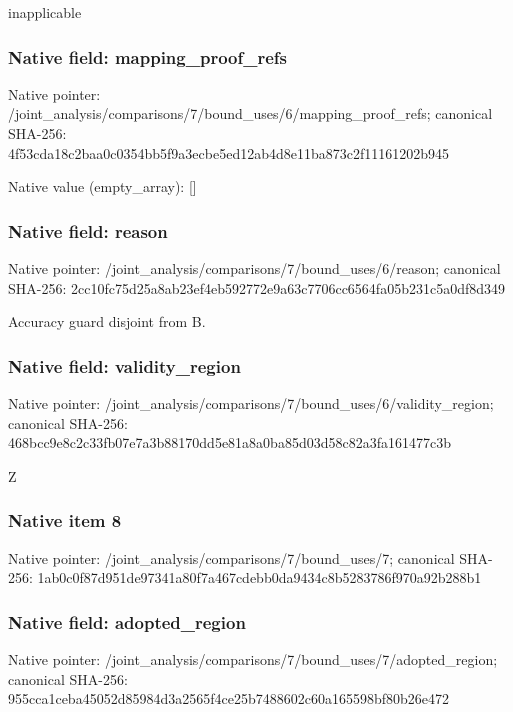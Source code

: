 \documentclass[10pt,a4paper]{article}
\begin{document}
\begingroup\raggedright\sloppy inapplicable\par\endgroup

\subsubsection{Native field: mapping\_\allowbreak{}proof\_\allowbreak{}refs}
Native pointer: /joint\_\allowbreak{}analysis/comparisons/7/bound\_\allowbreak{}uses/6/mapping\_\allowbreak{}proof\_\allowbreak{}refs; canonical SHA-256: 4f53cda18c2baa0c0354bb5f9a3ecbe5ed12ab4d8e11ba873c2f11161202b945

Native value (empty\_\allowbreak{}array): []

\subsubsection{Native field: reason}
Native pointer: /joint\_\allowbreak{}analysis/comparisons/7/bound\_\allowbreak{}uses/6/reason; canonical SHA-256: 2cc10fc75d25a8ab23ef4eb592772e9a63c7706cc6564fa05b231c5a0df8d349

\begingroup\raggedright\sloppy Accuracy guard disjoint from B.\par\endgroup

\subsubsection{Native field: validity\_\allowbreak{}region}
Native pointer: /joint\_\allowbreak{}analysis/comparisons/7/bound\_\allowbreak{}uses/6/validity\_\allowbreak{}region; canonical SHA-256: 468bcc9e8c2c33fb07e7a3b88170dd5e81a8a0ba85d03d58c82a3fa161477c3b

\begingroup\raggedright\sloppy Z\par\endgroup

\subsubsection{Native item 8}
Native pointer: /joint\_\allowbreak{}analysis/comparisons/7/bound\_\allowbreak{}uses/7; canonical SHA-256: 1ab0c0f87d951de97341a80f7a467cdebb0da9434c8b5283786f970a92b288b1

\subsubsection{Native field: adopted\_\allowbreak{}region}
Native pointer: /joint\_\allowbreak{}analysis/comparisons/7/bound\_\allowbreak{}uses/7/adopted\_\allowbreak{}region; canonical SHA-256: 955cca1ceba45052d85984d3a2565f4ce25b7488602c60a165598bf80b26e472
\end{document}
